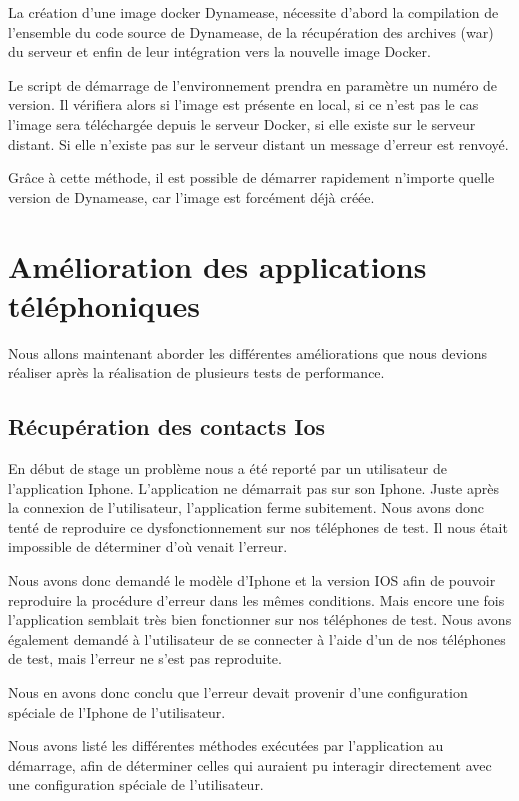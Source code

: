 La création d'une image docker Dynamease, nécessite d'abord la compilation de l'ensemble du code source de Dynamease, de la récupération des archives (war) du serveur et enfin de leur intégration vers la nouvelle image Docker.

Le script de démarrage de l'environnement prendra en paramètre un numéro de version. Il vérifiera alors si l'image est présente en local, si ce n'est pas le cas l'image sera téléchargée depuis le serveur Docker, si elle existe sur le serveur distant. Si elle n'existe pas sur le serveur distant un message d'erreur est renvoyé.

Grâce à cette méthode, il est possible de démarrer rapidement n'importe quelle version de Dynamease, car l'image est forcément déjà créée.

\section{Amélioration des applications téléphoniques}

Nous allons maintenant aborder les différentes améliorations que nous devions réaliser après la réalisation de plusieurs tests de performance.

\subsection{Récupération des contacts Ios}

En début de stage un problème nous a été reporté par un utilisateur de l'application Iphone. L'application ne démarrait pas sur son Iphone. Juste après la connexion de l'utilisateur, l'application ferme subitement. Nous avons donc tenté de reproduire ce dysfonctionnement sur nos téléphones de test. Il nous était impossible de déterminer d'où venait l'erreur.

Nous avons donc demandé le modèle d'Iphone et la version IOS afin de pouvoir reproduire la procédure d'erreur dans les mêmes conditions. Mais encore une fois l'application semblait très bien fonctionner sur nos téléphones de test. Nous avons également demandé à l'utilisateur de se connecter à l'aide d'un de nos téléphones de test, mais l'erreur ne s'est pas reproduite.

Nous en avons donc conclu que l'erreur devait provenir d'une configuration spéciale de l'Iphone de l'utilisateur.

Nous avons listé les différentes méthodes exécutées par l'application au démarrage, afin de déterminer celles qui auraient pu interagir directement avec une configuration spéciale de l'utilisateur.

